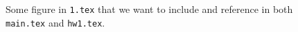 \begin{figure}[htbp]
    \centering
    \caption{Some figure in \texttt{1.tex} that we want to include and reference in both \texttt{main.tex} and \texttt{hw1.tex}.}
    \label{fig:1}
\end{figure}